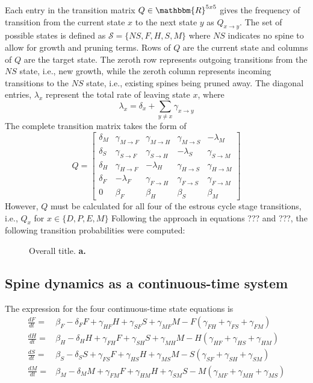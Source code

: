 \documentclass[11pt,letterpaper, onecolumn]{exam}
\begin{document}
Each entry in the transition matrix $Q\in \mathbbm{R}^{5x5}$ gives the frequency of transition from the current state $x$ to the next state $y$ as $Q_{x\to y}$. The set of possible states is defined as $\mathcal{S}=\{NS,F,H,S,M\}$ where $NS$ indicates no spine to allow for growth and pruning terms. Rows of $Q$ are the current state and columns of $Q$ are the target state. The zeroth row represents outgoing transitions from the $NS$ state, i.e., new growth, while the zeroth column represents incoming transitions to the $NS$ state, i.e., existing spines being pruned away. The diagonal entries, $\lambda_x$ represent the total rate of leaving state $x$, where
\[\lambda_x=\delta_x+\sum_{y\neq x}\gamma_{x\to y}\]
The complete transition matrix takes the form of
\[Q = \begin{bmatrix}
\delta_M & \gamma_{M \to F} & \gamma_{M \to H} & \gamma_{M \to S} & -\lambda_M \\
\delta_S & \gamma_{S \to F} & \gamma_{S \to H} & -\lambda_S & \gamma_{S \to M} \\
\delta_H & \gamma_{H \to F} & -\lambda_H & \gamma_{H \to S} & \gamma_{H \to M} \\
\delta_F & -\lambda_F & \gamma_{F \to H} & \gamma_{F \to S} & \gamma_{F \to M} \\
0 & \beta_F & \beta_H & \beta_S & \beta_M
\end{bmatrix}\]
However, $Q$ must be calculated for all four of the estrous cycle stage transitions, i.e., $Q_x$ for $x\in\{D,P,E,M\}$ Following the approach in equations ??? and ???, the following transition probabilities were computed:

\begin{figure}[h]
    \centering
    \caption{Overall title. \textbf{a.} }
    \label{fig:intro}
\end{figure}

\subsection{Spine dynamics as a continuous-time system}

The expression for the four continuous-time state equations is
\begin{equation}
\begin{split}
\frac{dF}{dt}= &\beta_F - \delta_FF+\gamma_{HF}H+\gamma_{SF}S+\gamma_{MF}M-F(\gamma_{FH}+\gamma_{FS}+\gamma_{FM})\\
\frac{dH}{dt} = &\beta_H - \delta_H H + \gamma_{FH} F + \gamma_{SH} S + \gamma_{MH} M - H (\gamma_{HF} + \gamma_{HS} + \gamma_{HM})\\
\frac{dS}{dt} = &\beta_S - \delta_S S + \gamma_{FS} F + \gamma_{HS} H + \gamma_{MS} M - S (\gamma_{SF} + \gamma_{SH} + \gamma_{SM})\\
\frac{dM}{dt} = &\beta_M - \delta_M M + \gamma_{FM} F + \gamma_{HM} H + \gamma_{SM} S - M (\gamma_{MF} + \gamma_{MH} + \gamma_{MS})
\end{split}
\end{equation}
\end{document}
